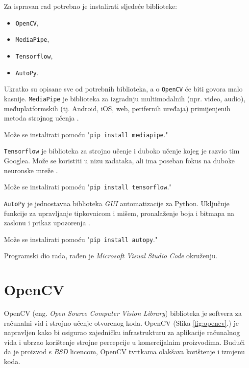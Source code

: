 \documentclass[]{foi} %
\begin{document}
\noindent
Za ispravan rad potrebno je instalirati sljedeće biblioteke:

\begin{itemize}
    \item \texttt{OpenCV},
    \item \texttt{MediaPipe},
    \item \texttt{Tensorflow},
    \item \texttt{AutoPy}.
\end{itemize}

\noindent
Ukratko su opisane sve od potrebnih biblioteka, a o \texttt{OpenCV} će biti govora malo kasnije.
\noindent
\texttt{MediaPipe} je biblioteka za izgradnju multimodalnih (npr. video, audio), međuplatformskih (tj. Android, iOS, web, perifernih uređaja) primijenjenih metoda strojnog učenja \cite{install}.

Može se instalirati pomoću "\texttt{pip install mediapipe}."

\noindent
\texttt{Tensorflow} je biblioteka za strojno učenje i duboko učenje kojeg je razvio tim Googlea. Može se koristiti u nizu zadataka, ali ima poseban fokus na duboke neuronske mreže \cite{install}.

Može se instalirati pomoću "\texttt{pip install tensorflow}."

\noindent
\texttt{AutoPy} je jednostavna biblioteka \textit{GUI} automatizacije za Python. Uključuje funkcije za upravljanje tipkovnicom i mišem, pronalaženje boja i bitmapa na zaslonu i prikaz upozorenja \cite{install}.

Može se instalirati pomoću "\texttt{pip install autopy}."

\noindent
Programski dio rada, rađen je \textit{Microsoft Visual Studio Code} okruženju.

\newpage
\section{OpenCV}

OpenCV (eng. \textit{Open Source Computer Vision Library}) \cite{opencv} biblioteka je softvera za računalni vid i strojno učenje otvorenog koda. OpenCV (Slika \ref{fig:opencv}.) je napravljen kako bi osigurao zajedničku infrastrukturu za aplikacije računalnog vida i ubrzao korištenje strojne percepcije u komercijalnim proizvodima. Budući da je proizvod s \textit{BSD} licencom, OpenCV tvrtkama olakšava korištenje i izmjenu koda.
\end{document}
